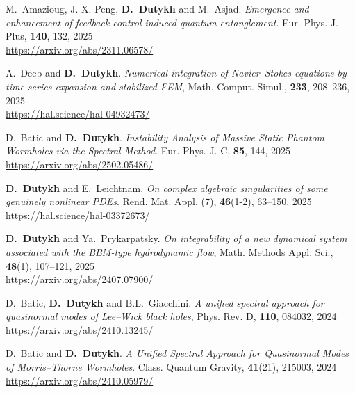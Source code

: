 \begin{etaremune}
  \item M.~Amazioug, J.-X. Peng, \textbf{D.~Dutykh} and M.~Asjad. \textit{Emergence and enhancement of feedback control induced quantum entanglement}. Eur. Phys. J. Plus, \textbf{140}, 132, 2025 \\ %
  \url{https://arxiv.org/abs/2311.06578/}

  \item A.~Deeb and \textbf{D.~Dutykh}. \textit{Numerical integration of Navier--Stokes equations by time series expansion and stabilized FEM}, Math. Comput. Simul., \textbf{233}, 208--236, 2025 \\ %
  \url{https://hal.science/hal-04932473/}

  \item D.~Batic and \textbf{D.~Dutykh}. \textit{Instability Analysis of Massive Static Phantom Wormholes via the Spectral Method}. Eur. Phys. J. C, \textbf{85}, 144, 2025 \\ %
  \url{https://arxiv.org/abs/2502.05486/}

  \item \textbf{D.~Dutykh} and E.~Leichtnam. \textit{On complex algebraic singularities of some genuinely nonlinear PDEs}. Rend. Mat. Appl. (7), \textbf{46}(1-2), 63--150, 2025 \\ %
  \url{https://hal.science/hal-03372673/}

  \item \textbf{D.~Dutykh} and Ya.~Prykarpatsky. \textit{On integrability of a new dynamical system associated with the BBM-type hydrodynamic flow}, Math. Methods Appl. Sci., \textbf{48}(1), 107--121, 2025 \\ %
  \url{https://arxiv.org/abs/2407.07900/}



  \item D.~Batic, \textbf{D.~Dutykh} and B.L.~Giacchini. \textit{A unified spectral approach for quasinormal modes of Lee--Wick black holes}, Phys. Rev. D, \textbf{110}, 084032, 2024 \\ %
  \url{https://arxiv.org/abs/2410.13245/}

  \item D.~Batic and \textbf{D.~Dutykh}. \textit{A Unified Spectral Approach for Quasinormal Modes of Morris--Thorne Wormholes}. Class. Quantum Gravity, \textbf{41}(21), 215003, 2024 \\ %
  \url{https://arxiv.org/abs/2410.05979/}


\end{etaremune}
